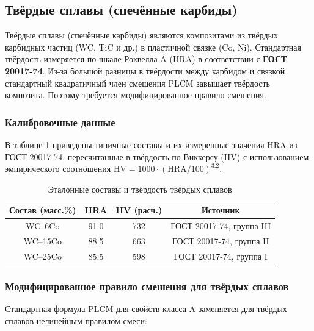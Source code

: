 \documentclass[12pt,a4paper]{article}
\begin{document}
	
	\subsection{Твёрдые сплавы (спечённые карбиды)}
	\label{subsec:hardmetals}
	
	Твёрдые сплавы (спечённые карбиды) являются композитами из твёрдых карбидных частиц (WC, TiC и др.) в пластичной связке (Co, Ni). Стандартная твёрдость измеряется по шкале Роквелла A (HRA) в соответствии с \textbf{ГОСТ 20017-74}. Из-за большой разницы в твёрдости между карбидом и связкой стандартный квадратичный член смешения PLCM завышает твёрдость композита. Поэтому требуется модифицированное правило смешения.
	
	\subsubsection{Калибровочные данные}
	В таблице \ref{tab:hardmetal_compositions} приведены типичные составы и их измеренные значения HRA из ГОСТ 20017-74, пересчитанные в твёрдость по Виккерсу (HV) с использованием эмпирического соотношения $\text{HV} = 1000 \cdot (\text{HRA}/100)^{3.2}$.
	
	\begin{table}[htbp]
		\centering
		\caption{Эталонные составы и твёрдость твёрдых сплавов}
		\label{tab:hardmetal_compositions}
		\begin{tabular}{cccc}
			\toprule
			\textbf{Состав (масс.\%)} & \textbf{HRA} & \textbf{HV (расч.)} & \textbf{Источник} \\
			\midrule
			WC–6Co & 91.0 & 732 & ГОСТ 20017-74, группа III \\
			WC–15Co & 88.5 & 663 & ГОСТ 20017-74, группа II \\
			WC–25Co & 85.5 & 598 & ГОСТ 20017-74, группа I \\
			\bottomrule
		\end{tabular}
	\end{table}
	
	\subsubsection{Модифицированное правило смешения для твёрдых сплавов}
	Стандартная формула PLCM для свойств класса A заменяется для твёрдых сплавов нелинейным правилом смеси:
	
\end{document}

